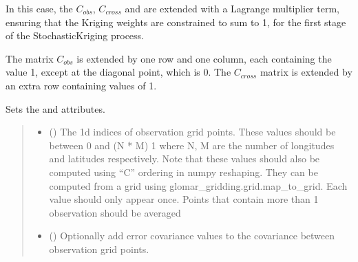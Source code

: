 \documentclass[letterpaper,10pt,english]{sphinxmanual}
\begin{document}
\begin{fulllineitems}
\begin{fulllineitems}
\sphinxAtStartPar
In this case, the \(C_{obs}\), \(C_{cross}\) and are extended
with a Lagrange multiplier term, ensuring that the Kriging weights are
constrained to sum to 1, for the first stage of the StochasticKriging
process.

\sphinxAtStartPar
The matrix \(C_{obs}\) is extended by one row and one column, each
containing the value 1, except at the diagonal point, which is 0. The
\(C_{cross}\) matrix is extended by an extra row containing values
of 1.

\sphinxAtStartPar
Sets the  and  attributes.
\begin{quote}\begin{description}
\begin{itemize}
\item {}
\sphinxAtStartPar
{} (\sphinxstyleliteralemphasis{\sphinxupquote{{[}}}\sphinxstyleliteralemphasis{\sphinxupquote{{]} }}\sphinxstyleliteralemphasis{\sphinxupquote{| }}\sphinxstyleliteralemphasis{\sphinxupquote{{[}}}\sphinxstyleliteralemphasis{\sphinxupquote{{]}}}) \textendash{} The 1d indices of observation grid points. These values should be
between 0 and (N * M) \sphinxhyphen{} 1 where N, M are the number of longitudes
and latitudes respectively. Note that these values should also be
computed using “C” ordering in numpy reshaping. They can be
computed from a grid using glomar\_gridding.grid.map\_to\_grid. Each
value should only appear once. Points that contain more than 1
observation should be averaged

\item {}
\sphinxAtStartPar
{} (\sphinxstyleliteralemphasis{\sphinxupquote{ | }}) \textendash{} Optionally add error covariance values to the covariance between
observation grid points.

\end{itemize}

\sphinxAtStartPar
{}

\end{description}\end{quote}


\end{fulllineitems}
\end{fulllineitems}
\end{document}
